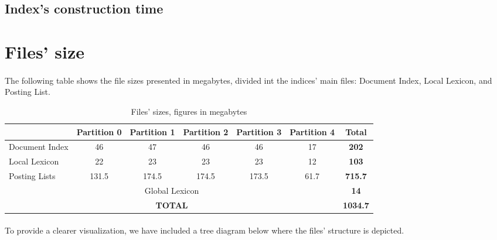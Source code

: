 \subsection{Index's construction time}

	
\section{Files' size}

\paragraph{}
The following table shows the file sizes presented in megabytes, divided int the indices' main files: Document Index, Local Lexicon, and Posting List.

\begin{table}[H]
	\centering
	\begin{tabular}{|l|*{5}{c|}c|}
		\hline
		& \textbf{Partition 0} & \textbf{Partition 1} & \textbf{Partition 2} & \textbf{Partition 3} & \textbf{Partition 4} & \textbf{Total} \\
		\hline
		Document Index & 46 & 47 & 46 & 46 & 17 & \textbf{202} \\
		Local Lexicon & 22 & 23 & 23 & 23 & 12 & \textbf{103} \\
		Posting Lists & 131.5 & 174.5 & 174.5 & 173.5 & 61.7 & \textbf{715.7} \\
		\hline
		\multicolumn{6}{|c|}{Global Lexicon} & \textbf{14} \\
		\hline
		\multicolumn{6}{|c|}{\textbf{TOTAL}} & \textbf{1034.7} \\
		\hline
	\end{tabular}
	\caption{Files' sizes, figures in megabytes}
	\label{tab:spanning_table}
\end{table}

\paragraph{}
To provide a clearer visualization, we have included a tree diagram below where the files' structure is depicted.


